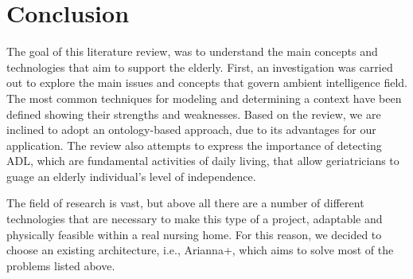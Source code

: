 \documentclass{thesisreport}
\begin{document}
 \chapter{Conclusion}
 
 The goal of this literature review, was to understand the main concepts and technologies that aim to support the elderly.
 First, an investigation was carried out to explore the main issues and concepts that govern ambient intelligence field.
 The most common techniques for modeling and determining a context have been defined showing their strengths and weaknesses. Based on the review, we are inclined to adopt an ontology-based approach, due to its advantages for our application.
 The review also attempts to express the importance of detecting ADL, which are fundamental activities of daily living, that allow geriatricians to guage an elderly individual's level of independence.
 
 The field of research is vast, but above all there are a number of different technologies that are necessary to make this type of a project, adaptable and physically feasible within a real nursing home. 
 For this reason, we decided to choose an existing architecture, i.e., Arianna+, which aims to solve most of the problems listed above.
\end{document}
